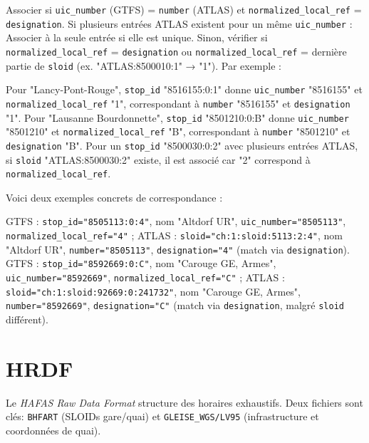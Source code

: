 Associer si \texttt{uic\_number} (GTFS) = \texttt{number} (ATLAS) et \texttt{normalized\_local\_ref} = \texttt{designation}.
Si plusieurs entrées ATLAS existent pour un même \texttt{uic\_number} :
Associer à la seule entrée si elle est unique.
Sinon, vérifier si \texttt{normalized\_local\_ref} = \texttt{designation} ou \texttt{normalized\_local\_ref} = dernière partie de \texttt{sloid} (ex. "ATLAS:8500010:1" → "1").
Par exemple :

Pour "Lancy-Pont-Rouge", \texttt{stop\_id} "8516155:0:1" donne \texttt{uic\_number} "8516155" et \texttt{normalized\_local\_ref} "1", correspondant à \texttt{number} "8516155" et \texttt{designation} "1".
Pour "Lausanne Bourdonnette", \texttt{stop\_id} "8501210:0:B" donne \texttt{uic\_number} "8501210" et \texttt{normalized\_local\_ref} "B", correspondant à \texttt{number} "8501210" et \texttt{designation} "B".
Pour un \texttt{stop\_id} "8500030:0:2" avec plusieurs entrées ATLAS, si \texttt{sloid} "ATLAS:8500030:2" existe, il est associé car "2" correspond à \texttt{normalized\_local\_ref}.

Voici deux exemples concrets de correspondance :

GTFS : \texttt{stop\_id="8505113:0:4"}, nom "Altdorf UR", \texttt{uic\_number="8505113"}, \texttt{normalized\_local\_ref="4"} ; ATLAS : \texttt{sloid="ch:1:sloid:5113:2:4"}, nom "Altdorf UR", \texttt{number="8505113"}, \texttt{designation="4"} (match via \texttt{designation}).
GTFS : \texttt{stop\_id="8592669:0:C"}, nom "Carouge GE, Armes", \texttt{uic\_number="8592669"}, \texttt{normalized\_local\_ref="C"} ; ATLAS : \texttt{sloid="ch:1:sloid:92669:0:241732"}, nom "Carouge GE, Armes", \texttt{number="8592669"}, \texttt{designation="C"} (match via \texttt{designation}, malgré \texttt{sloid} différent).

\section{HRDF}
Le \textit{HAFAS Raw Data Format} structure des horaires exhaustifs. Deux fichiers sont clés: \texttt{BHFART} (SLOIDs gare/quai) et \texttt{GLEISE\_WGS/LV95} (infrastructure et coordonnées de quai).

